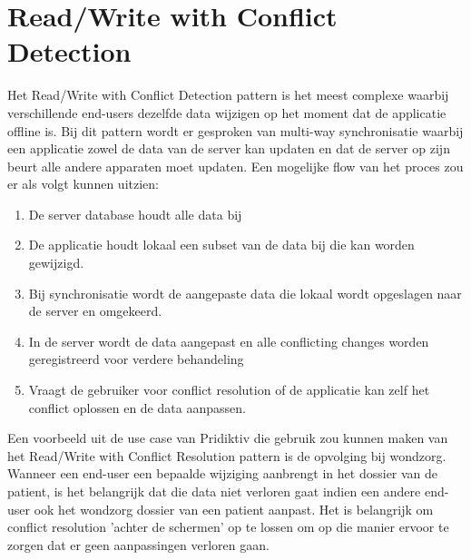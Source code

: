 \section{Read/Write with Conflict Detection}
Het Read/Write with Conflict Detection pattern is het meest complexe waarbij verschillende end-users dezelfde data wijzigen op het moment dat de applicatie offline is. Bij dit pattern wordt er gesproken van multi-way synchronisatie waarbij een applicatie zowel de data van de server kan updaten en dat de server op zijn beurt alle andere apparaten moet updaten. Een mogelijke flow van het proces zou er als volgt kunnen uitzien:
\begin{enumerate}
\item De server database houdt alle data bij
\item De applicatie houdt lokaal een subset van de data bij die kan worden gewijzigd.
\item Bij synchronisatie wordt de aangepaste data die lokaal wordt opgeslagen naar de server en omgekeerd.
\item In de server wordt de data aangepast en alle conflicting changes worden geregistreerd voor verdere behandeling
\item Vraagt de gebruiker voor conflict resolution of de applicatie kan zelf het conflict oplossen en de data aanpassen.
\end{enumerate}
Een voorbeeld uit de use case van Pridiktiv die gebruik zou kunnen maken van het Read/Write with Conflict Resolution pattern is de opvolging bij wondzorg. Wanneer een end-user een bepaalde wijziging aanbrengt in het dossier van de patient, is het belangrijk dat die data niet verloren gaat indien een andere end-user ook het wondzorg dossier van een patient aanpast. Het is belangrijk om conflict resolution 'achter de schermen' op te lossen om op die manier ervoor te zorgen dat er geen aanpassingen verloren gaan.
